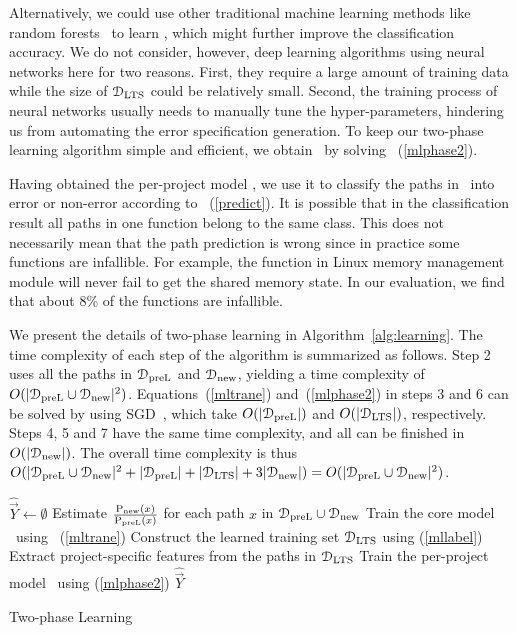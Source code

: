 \documentclass[12pt]{report}	%
\begin{document}
Alternatively, we could use other traditional machine learning methods like random forests~\cite{breiman2001random}
to learn \ppm, which might further improve the classification accuracy.
We do not consider, however, deep learning algorithms using neural networks here for two reasons.
First, they require a large amount of training data 
while the size of $\mathcal{D}_\text{LTS}$ could be relatively small.
Second, the training process of neural networks usually needs to manually tune the hyper-parameters,
hindering us from automating the error specification generation.
%
To keep our two-phase learning algorithm simple and efficient,
we obtain \ppm\ by solving \eqn\ (\ref{mlphase2}).

%
Having obtained the per-project model \ppm,
we use it to classify the paths in \DT\ into error or non-error
according to \eqn~(\ref{predict}).
%
It is possible that in the classification result 
all paths in one function belong to the same class.
This does not necessarily mean that the path prediction is wrong
since in practice some functions are infallible.
For example, the function  in Linux memory management module
will never fail to get the shared memory state.
In our evaluation, we find that about 8\% of the functions are infallible.

%
We present the details of two-phase learning in Algorithm~\ref{alg:learning}.
%
The time complexity of each step of the algorithm is summarized as follows.
Step 2 uses all the paths in $\mathcal{D}_\text{preL}$ and $\mathcal{D}_\text{new}$, yielding a time complexity of $O(|\mathcal{D}_\text{preL} \cup \mathcal{D}_\text{new}|^2)$.
Equations~(\ref{mltrane}) and~(\ref{mlphase2}) in steps 3 and 6 can be solved by using SGD~\cite{robbins1951stochastic},
which take $O(|\mathcal{D}_\text{preL}|)$ and $O(|\mathcal{D}_\text{LTS}|)$, respectively.
Steps 4, 5 and 7 have the same time complexity, and all can be finished in $O(|\mathcal{D}_\text{new}|)$. The overall time complexity is thus 
$O(|\mathcal{D}_\text{preL} \cup \mathcal{D}_\text{new}|^2 + |\mathcal{D}_\text{preL}| + |\mathcal{D}_\text{LTS}| + 3|\mathcal{D}_\text{new}|) = O(|\mathcal{D}_\text{preL} \cup \mathcal{D}_\text{new}|^2)$.

\newcommand*{\argmaxl}{\argmax\limits}
\begin{algorithm}[t]
$\hat{\vec{Y}} \gets \emptyset$\;
Estimate $\frac{\text{P}_\text{new} (x)}{\text{P}_\text{preL} (x)}$ for each path $x$ in $\mathcal{D}_\text{preL} \cup \mathcal{D}_\text{new}$\;
Train the core model \cm\ using \eqn\ (\ref{mltrane})\;
Construct the learned training set $\mathcal{D}_\text{LTS}$ using \eqn (\ref{mllabel})\;
Extract project-specific features from the paths in $\mathcal{D}_\text{LTS}$\;
Train the per-project model \ppm\ using \eqn (\ref{mlphase2})\;
\ForEach{$x \in \DT$}{
$\hat{\vec{Y}} \gets \hat{\vec{Y}} \cup \{(x, \argmaxl_{y \in \{-1, +1\}} \prb (y | x, \ppm))\}$\;
}
\Return $\hat{\vec{Y}}$\;
\caption{Two-phase Learning}
\label{alg:learning}
\end{algorithm}
\end{document}
